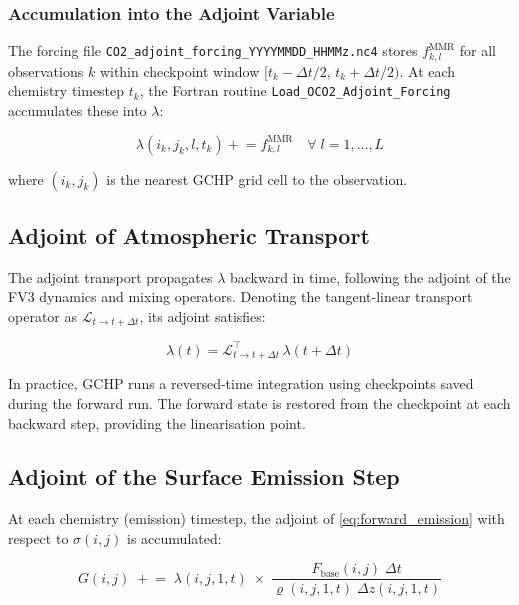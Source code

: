 \documentclass[12pt]{article}
\newcommand{\mmr}{\mathrm{MMR}}
\begin{document}
\subsubsection{Accumulation into the Adjoint Variable}

The forcing file \texttt{CO2\_adjoint\_forcing\_YYYYMMDD\_HHMMz.nc4} stores
$f_{k,l}^{\mmr}$ for all observations $k$ within checkpoint window $[t_k - \Delta t/2,\, t_k + \Delta t/2)$.
At each chemistry timestep $t_k$, the Fortran routine
\texttt{Load\_OCO2\_Adjoint\_Forcing} accumulates these into $\lambda$:

\begin{equation}
  \lambda(i_k, j_k, l, t_k) \mathrel{+}= f_{k,l}^{\mmr}
  \quad \forall\; l = 1, \ldots, L
  \label{eq:load_forcing}
\end{equation}

where $(i_k, j_k)$ is the nearest GCHP grid cell to the observation.

\subsection{Adjoint of Atmospheric Transport}

The adjoint transport propagates $\lambda$ backward in time, following the adjoint
of the FV3 dynamics and mixing operators. Denoting the tangent-linear transport
operator as $\mathcal{L}_{t \to t+\Delta t}$, its adjoint satisfies:

\begin{equation}
  \lambda(t) = \mathcal{L}_{t \to t+\Delta t}^\top\,\lambda(t + \Delta t)
\end{equation}

In practice, GCHP runs a reversed-time integration using checkpoints saved
during the forward run. The forward state is restored from the checkpoint at
each backward step, providing the linearisation point.

\subsection{Adjoint of the Surface Emission Step}

At each chemistry (emission) timestep, the adjoint of
\eqref{eq:forward_emission} with respect to $\sigma(i,j)$ is accumulated:

\begin{equation}
  \boxed{
  G(i,j) \;\mathrel{+}=\;
  \lambda(i,j,1,t)\;\times\;
  \frac{F_{\mathrm{base}}(i,j)\;\Delta t}
       {\varrho(i,j,1,t)\;\Delta z(i,j,1,t)}
  }
  \label{eq:srf_adj}
\end{equation}
\end{document}
